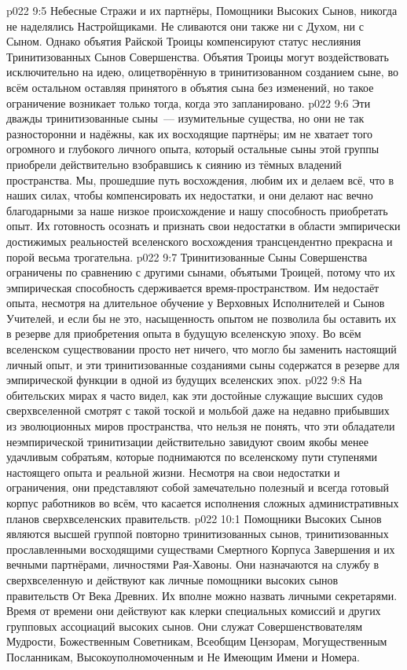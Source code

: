 \vs p022 9:5 \pc Небесные Стражи и их партнёры, Помощники Высоких Сынов, никогда не наделялись Настройщиками. Не сливаются они также ни с Духом, ни с Сыном. Однако объятия Райской Троицы компенсируют статус неслияния Тринитизованных Сынов Совершенства. Объятия Троицы могут воздействовать исключительно на идею, олицетворённую в тринитизованном созданием сыне, во всём остальном оставляя принятого в объятия сына без изменений, но такое ограничение возникает только тогда, когда это запланировано.
\vs p022 9:6 Эти дважды тринитизованные сыны~--- изумительные существа, но они не так разносторонни и надёжны, как их восходящие партнёры; им не хватает того огромного и глубокого личного опыта, который остальные сыны этой группы приобрели действительно взобравшись к сиянию из тёмных владений пространства. Мы, прошедшие путь восхождения, любим их и делаем всё, что в наших силах, чтобы компенсировать их недостатки, и они делают нас вечно благодарными за наше низкое происхождение и нашу способность приобретать опыт. Их готовность осознать и признать свои недостатки в области эмпирически достижимых реальностей вселенского восхождения трансцендентно прекрасна и порой весьма трогательна.
\vs p022 9:7 Тринитизованные Сыны Совершенства ограничены по сравнению с другими сынами, объятыми Троицей, потому что их эмпирическая способность сдерживается время\hyp{}пространством. Им недостаёт опыта, несмотря на длительное обучение у Верховных Исполнителей и Сынов Учителей, и если бы не это, насыщенность опытом не позволила бы оставить их в резерве для приобретения опыта в будущую вселенскую эпоху. Во всём вселенском существовании просто нет ничего, что могло бы заменить настоящий личный опыт, и эти тринитизованные созданиями сыны содержатся в резерве для эмпирической функции в одной из будущих вселенских эпох.
\vs p022 9:8 На обительских мирах я часто видел, как эти достойные служащие высших судов сверхвселенной смотрят с такой тоской и мольбой даже на недавно прибывших из эволюционных миров пространства, что нельзя не понять, что эти обладатели неэмпирической тринитизации действительно завидуют своим якобы менее удачливым собратьям, которые поднимаются по вселенскому пути ступенями настоящего опыта и реальной жизни. Несмотря на свои недостатки и ограничения, они представляют собой замечательно полезный и всегда готовый корпус работников во всём, что касается исполнения сложных административных планов сверхвселенских правительств.
\vs p022 10:1 Помощники Высоких Сынов являются высшей группой повторно тринитизованных сынов, тринитизованных прославленными восходящими существами Смертного Корпуса Завершения и их вечными партнёрами, личностями Рая\hyp{}Хавоны. Они назначаются на службу в сверхвселенную и действуют как личные помощники высоких сынов правительств От Века Древних. Их вполне можно назвать личными секретарями. Время от времени они действуют как клерки специальных комиссий и других групповых ассоциаций высоких сынов. Они служат Совершенствователям Мудрости, Божественным Советникам, Всеобщим Цензорам, Могущественным Посланникам, Высокоуполномоченным и Не Имеющим Имени и Номера.
